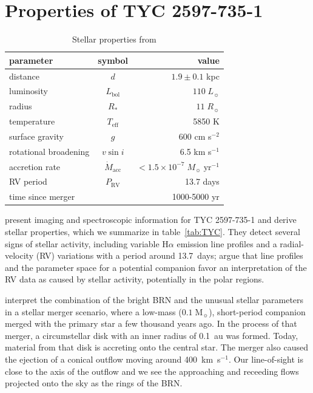 \documentclass[linenumbers]{aastex631}
\begin{document}
\section{Properties of TYC 2597-735-1}
\label{sec:properties}

\begin{table}
\caption{Stellar properties from \citet{2020Natur.587..387H} \label{tab:parameters}}
\begin{tabular}{lcr}
\hline \hline
parameter & symbol & value \\
\hline
distance & $d$ & $1.9 \pm 0.1$ kpc\\
luminosity & $L_\mathrm{bol}$ & $110 \;L_\sun{}$\\
radius & $R_*$ & $11\;R_\sun{}$\\
temperature & $T_\mathrm{eff}$ & 5850 K\\
surface gravity & $g$ & 600 cm s$^{-2}$\\
rotational broadening & $v \sin i$ & 6.5 km s$^{-1}$\\
accretion rate & $\dot M_\mathrm{acc}$ & $<1.5 \times 10^{-7}\; M_\sun{}\;\mathrm{yr}^{-1}$\\
RV period & $P_\mathrm{RV}$ & 13.7 days \\
time since merger & & 1000-5000 yr\\
\hline
\end{tabular}
\end{table}

\cite{2020Natur.587..387H} present imaging and spectroscopic information for TYC 2597-735-1 and derive stellar properties, which we summarize in table~\ref{tab:TYC}. They detect several signs of stellar activity, including variable H$\alpha$ emission line profiles and a radial-velocity (RV)  variations with a period around 13.7~days; \cite{2020Natur.587..387H} argue that line profiles and the parameter space for a potential companion favor an interpretation of the RV data as caused by stellar activity, potentially in the polar regions.

\cite{2020Natur.587..387H} interpret the combination of the bright BRN and the unusual stellar parameters in a stellar merger scenario, where a low-mass ($0.1\;\mathrm{M}_\sun$), short-period companion merged with the primary star a few thousand years ago. In the process of that merger, a circumstellar disk with an inner radius of 0.1~au was formed. Today, material from that disk is accreting onto the central star. The merger also caused the ejection of a conical outflow moving around 400~km~s$^{-1}$. Our line-of-sight is close to the axis of the outflow and we see the approaching and receeding flows projected onto the sky as the rings of the BRN.
\end{document}
